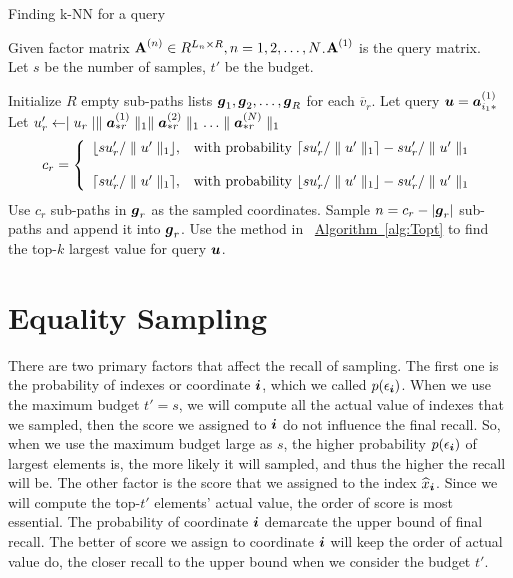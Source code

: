 \documentclass{article}
\newcommand{\V}[1]{{\bm{{\MakeLowercase{#1}}}}}%
\newcommand{\VnC}[3]{\V{#1}^{(#2)}_{#3}}%
\newcommand{\Vacol}[1]{\V{a}^{(#1)}_{*r}}
\newcommand{\M}[1]{{\bm{\mathbf{\MakeUppercase{#1}}}}}%
\newcommand{\norm}[2]{\parallel#1\parallel_{#2}}
\newcommand{\Alg}[1]{\hyperref[alg:#1]{Algorithm~\ref*{alg:#1}}}
\begin{document}
\begin{algorithm}[t]
    \caption{Finding k-NN for a query}
    \label{alg:QuerySampling}
        Given factor matrix $\M{A}^{(n)}\in R^{L_n\times R}, n = 1,2,\ldots,N$.$\M{A}^{(1)}$ is the query matrix.\\
        Let $s$ be the number of samples, $t'$ be the budget.
    \begin{algorithmic}[1]
    \State Initialize $R$ empty sub-paths lists $\V{g}_1,\V{g}_2,\ldots,\V{g}_R$ for each $\overline{v}_r$.
    \State Let query $\V{u}=\VnC{a}{1}{i_1*}$
    \State Let $u'_r \leftarrow \mid u_r\mid \norm{\Vacol{1}}{1} \norm{\Vacol{2}}{1} \ldots \norm{\Vacol{N}}{1}$
    \EndFor
    \State
    \begin{equation*}c_r=
        \left\{
          \begin{array}{ll}
            \lfloor su'_r/\norm{u'}{1} \rfloor,
            & \hbox{with probability $\lceil su'_r/\norm{u'}{1} \rceil - su'_r/\norm{u'}{1}$} \\\\
            \lceil su'_r/\norm{u'}{1} \rceil,
            & \hbox{with probability $\lfloor su'_r/\norm{u'}{1} \rfloor - su'_r/\norm{u'}{1}$}
          \end{array}
        \right.
    \end{equation*}
    \EndFor
    \If {$c_r\leq |\V{g}_r|$ }
    \State Use $c_r$ sub-paths in $\V{g}_r$ as the sampled coordinates.
    \Else
    \State Sample $n = c_r - |\V{g}_r|$ sub-paths and append it into $\V{g}_r$.
    \EndIf
    \State Use the method in ~\Alg{Topt} to find the top-$k$ largest value for query $\V{u}$.
    \EndFor
    \EndFor
    \end{algorithmic}
\end{algorithm}

\section{Equality Sampling}

There are two primary factors that affect the recall of sampling. The first one is the probability of indexes or coordinate $\V{i}$, which we called $p(\epsilon_{\V{i}})$. When we use the maximum budget $t'=s$, we will compute all the actual value of indexes that we sampled, then the score we assigned to $\V{i}$ do not influence the final recall. So, when we use the maximum budget large as $s$, the higher probability $p(\epsilon_{\V{i}})$ of largest elements is, the more likely it will sampled, and thus the higher the recall will be. The other factor is the score that we assigned to the index $\widehat{x}_{\V{i}}$. Since we will compute the top-$t'$ elements' actual value, the order of score is most essential. The probability of coordinate $\V{i}$ demarcate the upper bound of final recall. The better of score we assign to coordinate $\V{i}$ will keep the order of actual value do, the closer recall to the upper bound when we consider the budget $t'$.
\end{document}
